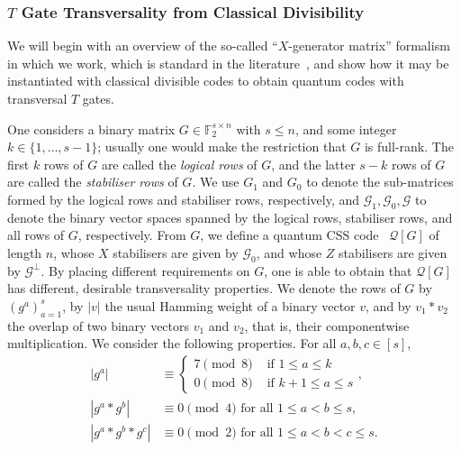 \documentclass{article}
\begin{document}
\subsubsection{\texorpdfstring{$T$}{} Gate Transversality from Classical Divisibility}\label{subsubsec:T_gate_classical_divis}

We will begin with an overview of the so-called ``$X$-generator matrix'' formalism in which we work, which is standard in the literature~\cite{bravyi2012magic,hastings2018distillation}, and show how it may be instantiated with classical divisible codes to obtain quantum codes with transversal $T$ gates.

One considers a binary matrix $G \in \mathbb{F}_2^{s \times n}$ with $s \leq n$, and some integer $k \in \{1, \ldots, s-1\}$; usually one would make the restriction that $G$ is full-rank. The first $k$ rows of $G$ are called the \textit{logical rows} of $G$, and the latter $s-k$ rows of $G$ are called the \textit{stabiliser rows} of $G$. We use $G_1$ and $G_0$ to denote the sub-matrices formed by the logical rows and stabiliser rows, respectively, and $\mathcal{G}_1, \mathcal{G}_0, \mathcal{G}$ to denote the binary vector spaces spanned by the logical rows, stabiliser rows, and all rows of $G$, respectively. From $G$, we define a quantum CSS code~\cite{calderbank1996good,steane1996multiple} $\mathcal{Q}[G]$ of length $n$, whose $X$ stabilisers are given by $\mathcal{G}_0$, and whose $Z$ stabilisers are given by $\mathcal{G}^\perp$. By placing different requirements on $G$, one is able to obtain that $\mathcal{Q}[G]$ has different, desirable transversality properties. We denote the rows of $G$ by $(g^a)_{a=1}^s$, by $|v|$ the usual Hamming weight of a binary vector $v$, and by $v_1*v_2$ the overlap of two binary vectors $v_1$ and $v_2$, that is, their componentwise multiplication. We consider the following properties. For all $a,b,c \in [s]$,
\begin{align}
    |g^a| &\equiv \begin{cases}
        7 \pmod 8 &\text{ if } 1 \leq a \leq k\label{eq:G_property_first}\\
        0 \pmod 8 &\text{ if } k+1 \leq a \leq s
    \end{cases},\\
    |g^a * g^b| &\equiv 0 \pmod 4 \text{ for all } 1 \leq a < b \leq s,\\
    |g^a * g^b * g^c| &\equiv 0 \pmod 2 \text{ for all } 1 \leq a < b < c \leq s.\label{eq:G_property_last}
\end{align}
\end{document}
